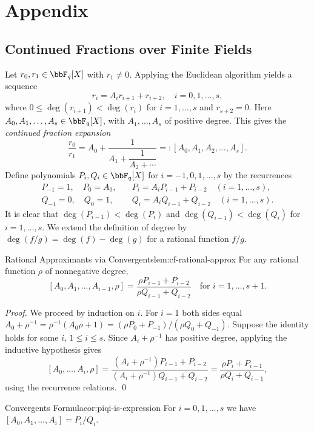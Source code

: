 \chapter{Appendix}
\section{Continued Fractions over Finite Fields}\label{sec:cont-frac-fq}

Let $r_0,r_1\in\bbF_q[X]$ with $r_1\neq 0$. Applying the Euclidean algorithm yields a sequence
$$r_i=A_ir_{i+1}+r_{i+2},\quad i=0,1,\dots,s,$$
where $0\leq\deg(r_{i+1})<\deg(r_i)$ for $i=1,\dots,s$ and $r_{s+2}=0$. Here $A_0,A_1,\dots,A_s\in\bbF_q[X]$, with $A_1,\dots,A_s$ of positive degree. This gives the \emph{continued fraction expansion}
$$\frac{r_0}{r_1}=A_0+\dfrac{1}{A_1+\dfrac{1}{A_2+\cdots}}=:[A_0,A_1,A_2,\dots,A_s].$$
Define polynomials $P_i,Q_i\in\bbF_q[X]$ for $i=-1,0,1,\dots,s$ by the recurrences
\begin{align*}
  P_{-1}=1,\quad P_0=A_0,\quad & P_i=A_iP_{i-1}+P_{i-2}\quad (i=1,\dots,s), \\
  Q_{-1}=0,\quad Q_0=1,\quad   & Q_i=A_iQ_{i-1}+Q_{i-2}\quad (i=1,\dots,s).
\end{align*}
It is clear that $\deg(P_{i-1})<\deg(P_i)$ and $\deg(Q_{i-1})<\deg(Q_i)$ for $i=1,\dots,s$. We extend the definition of degree by $\deg(f/g)=\deg(f)-\deg(g)$ for a rational function $f/g$.

\begin{lemma}{Rational Approximants via Convergents}{lem:cf-rational-approx}
  For any rational function $\rho$ of nonnegative degree,
  $$[A_0,A_1,\dots,A_{i-1},\rho]=\frac{\rho P_{i-1}+P_{i-2}}{\rho Q_{i-1}+Q_{i-2}}\quad\text{for }i=1,\dots,s+1.$$
\end{lemma}
\begin{proof}
  We proceed by induction on $i$. For $i=1$ both sides equal $A_0+\rho^{-1}=\rho^{-1}(A_0\rho+1)=(\rho P_0+P_{-1})/(\rho Q_0+Q_{-1})$. Suppose the identity holds for some $i$, $1\leq i\leq s$. Since $A_i+\rho^{-1}$ has positive degree, applying the inductive hypothesis gives
  $$[A_0,\dots,A_i,\rho]=\frac{(A_i+\rho^{-1})P_{i-1}+P_{i-2}}{(A_i+\rho^{-1})Q_{i-1}+Q_{i-2}}=\frac{\rho P_i+P_{i-1}}{\rho Q_i+Q_{i-1}},$$
  using the recurrence relations. \qed
\end{proof}

\begin{corolary}{Convergents Formula}{cor:piqi-is-expression}
  For $i=0,1,\dots,s$ we have $[A_0,A_1,\dots,A_i]=P_i/Q_i$.
\end{corolary}

